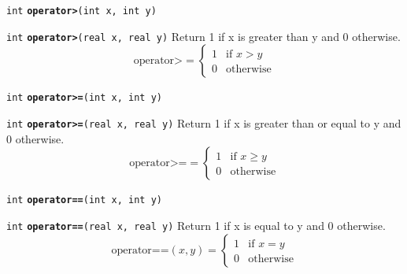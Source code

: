 \documentclass[
  10pt,
]{book}
\begin{document}

\texttt{int} \textbf{\texttt{operator\textgreater{}}}\texttt{(int\ x,\ int\ y)}\newline


\texttt{int} \textbf{\texttt{operator\textgreater{}}}\texttt{(real\ x,\ real\ y)}\newline
Return 1 if x is greater than y and 0 otherwise. \[ \text{operator>} =
\begin{cases} 1 & \text{if $x > y$} \\ 0 & \text{otherwise}
\end{cases} \]


\texttt{int} \textbf{\texttt{operator\textgreater{}=}}\texttt{(int\ x,\ int\ y)}\newline


\texttt{int} \textbf{\texttt{operator\textgreater{}=}}\texttt{(real\ x,\ real\ y)}\newline
Return 1 if x is greater than or equal to y and 0 otherwise. \[
\text{operator>=} = \begin{cases} 1 & \text{if $x \geq y$} \\ 0 &
\text{otherwise} \end{cases} \]


\texttt{int} \textbf{\texttt{operator==}}\texttt{(int\ x,\ int\ y)}\newline


\texttt{int} \textbf{\texttt{operator==}}\texttt{(real\ x,\ real\ y)}\newline
Return 1 if x is equal to y and 0 otherwise. \[ \text{operator==}(x,y)
= \begin{cases} 1 & \text{if $x = y$} \\ 0 & \text{otherwise}
\end{cases} \]
\end{document}
